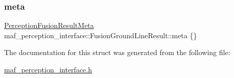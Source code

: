 \subsubsection{\texorpdfstring{meta}{meta}}
{\footnotesize\ttfamily \hyperlink{structmaf__perception__interface_1_1PerceptionFusionResultMeta}{Perception\+Fusion\+Result\+Meta} maf\+\_\+perception\+\_\+interface\+::\+Fusion\+Ground\+Line\+Result\+::meta \{\}}



The documentation for this struct was generated from the following file\+:\begin{DoxyCompactItemize}
\item 
\hyperlink{maf__perception__interface_8h}{maf\+\_\+perception\+\_\+interface.\+h}\end{DoxyCompactItemize}

